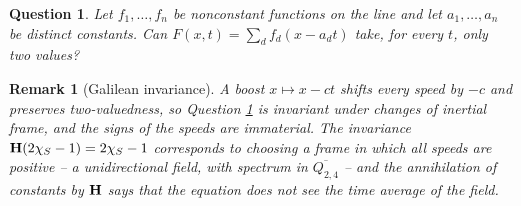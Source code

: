 \documentclass{article}
\newtheorem{question}{Question}
\newtheorem{remark}{Remark}
\def\H{{\bf H}}
\begin{document}
	\begin{question}\label{Qwaves}
		Let $f_1,\dots,f_n$ be nonconstant functions on the line and let $a_1,\dots,a_n$ be distinct constants. Can $F(x,t)=\sum_df_d(x-a_dt)$ take, for every $t$, only two values?
	\end{question}

	\begin{remark}[Galilean invariance]
		A boost $x\mapsto x-ct$ shifts every speed by $-c$ and preserves two-valuedness, so Question \ref{Qwaves} is invariant under changes of inertial frame, and the signs of the speeds are immaterial. The invariance $\H(2\chi_S-1)=2\chi_S-1$ corresponds to choosing a frame in which all speeds are positive -- a unidirectional field, with spectrum in $\overline{Q_{2,4}}$ -- and the annihilation of constants by $\H$ says that the equation does not see the time average of the field.
	\end{remark}
\end{document}
